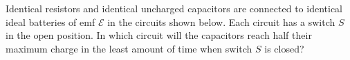 \begin{questions}\setcounter{question}{14}\question
Identical resistors and identical uncharged capacitors are connected to identical ideal batteries of emf $\mathcal{E}$ in the circuits shown below. Each circuit has a switch $S$ in the open position. In which circuit will the capacitors reach half their maximum charge in the least amount of time when switch $S$ is closed?

\begin{oneparchoices}
\choice {}
\choice {}
\choice {}

\end{oneparchoices}
\end{questions}
